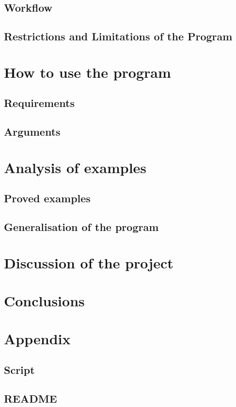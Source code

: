 \documentclass[a4paper,12pt]{report}
\begin{document}
\section{Workflow}




\section{Restrictions and Limitations of the Program}


\chapter{How to use the program}

\section{Requirements}

\section{Arguments}


\chapter{Analysis of examples}

\section{Proved examples}

\section{Generalisation of the program}




\chapter{Discussion of the project}


\chapter{Conclusions}



\chapter{Appendix}

\section{Script}

\section{README}
\end{document}
